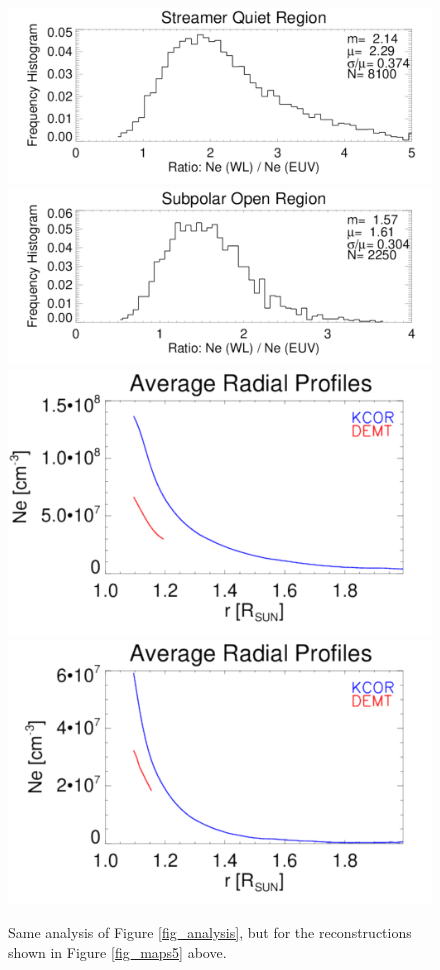 \documentclass[baaa]{baaa}
\begin{document}
\begin{figure}[!h]
  \centering
  \includegraphics[width=\columnwidth]{comparison_KCOR-Tom_vs_DEMT_CR2198_Lopt_13imag-Quiet-region1_range1105-1195_Rsun.pdf}
  \includegraphics[width=\columnwidth]{comparison_KCOR-Tom_vs_DEMT_CR2198_Lopt_13imag-Open-region_N_range1105-1155_Rsun.pdf}\\
  \includegraphics[width=0.75\columnwidth]{Average_Radial_Profiles_KCOR-Tom_vs_DEMT_CR2198_Lopt_13imag-Quiet-region1.pdf}
  \hskip 2cm
  \includegraphics[width=0.75\columnwidth]{Average_Radial_Profiles_KCOR-Tom_vs_DEMT_CR2198_Lopt_13imag-Open-region_N.pdf}
  \caption{Same analysis of Figure \ref{fig_analysis}, but for the reconstructions shown in Figure \ref{fig_maps5} above.}
  \label{fig_analysis5}
\end{figure}
\end{document}
